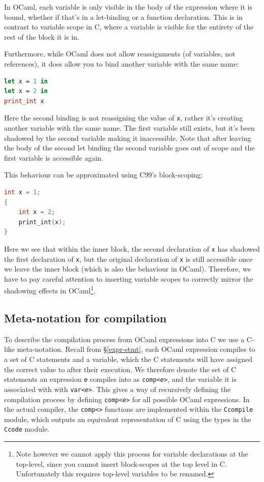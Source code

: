 \documentclass[12pt,a4paper,twoside,openright]{report}
\begin{document}
In OCaml, each variable is only visible in the body of the expression where it
is bound, whether if that's in a let-binding or a function declaration. This is
in contrast to variable scope in C, where a variable is visible for the entirety
of the rest of the block it is in.

Furthermore, while OCaml does not allow reassignments (of variables, not 
references), it does allow you to bind another variable with the same name:

\begin{lstlisting}[language=Caml]
let x = 1 in
let x = 2 in
print_int x
\end{lstlisting} 

Here the second binding is not reassigning the value of \texttt{x}, rather it's 
creating another variable with the same name. The first variable still exists, 
but it's been shadowed by the second variable making it inaccessible. Note that 
after leaving the body of the second let binding the second variable goes out 
of scope and the first variable is accessible again.

This behaviour can be approximated using C99's block-scoping:

\begin{lstlisting}[language=C]
int x = 1;
{
    int x = 2;
    print_int(x);
}
\end{lstlisting}

Here we see that within the inner block, the second declaration of \texttt{x}
has shadowed the first declaration of \texttt{x}, but the original declaration
of \texttt{x} is still accessible once we leave the inner block (which is also
the behaviour in OCaml). Therefore, we have to pay careful attention to
inserting variable scopes to correctly mirror the shadowing effects in
OCaml\footnote{Note however we cannot apply this process for variable
    declarations at the top-level, since you cannot insert block-scopes at the
    top level in C. Unfortunately this requires top-level variables to be
renamed.}.

\subsection{Meta-notation for compilation} \label{meta-notation}

To describe the compilation process from OCaml expressions into C we use a
C-like meta-notation. Recall from \S\ref{expr-stmt}, each OCaml expression
compiles to a set of C statements and a variable, which the C statements will
have assigned the correct value to after their execution. We therefore denote
the set of C statements an expression \textit{\texttt{e}} compiles into as
\texttt{comp<\textit{e}>}, and the variable it is associated with with
\texttt{var<\textit{e}>}. This gives a way of recursively defining the
compilation process by defining \texttt{comp<\textit{e}>} for all possible OCaml
expressions. In the actual compiler, the \texttt{comp<>} functions are
implemented within the \texttt{Ccompile} module, which outputs an equivalent
representation of C using the types in the \texttt{Ccode} module.
\end{document}
